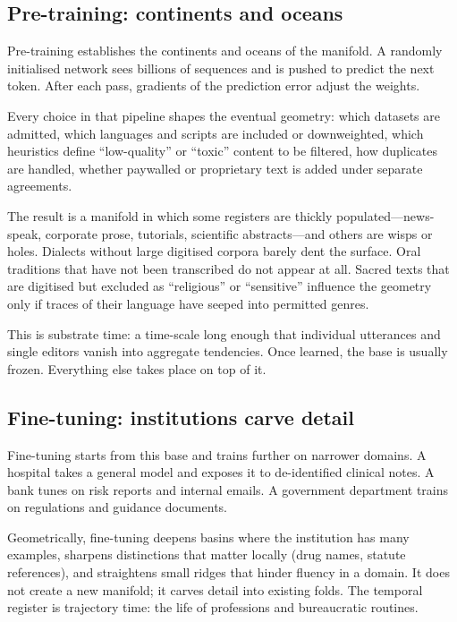 \subsection{Pre-training: continents and oceans}

Pre-training establishes the continents and oceans of the manifold. A randomly initialised network sees billions of sequences and is pushed to predict the next token. After each pass, gradients of the prediction error adjust the weights.

Every choice in that pipeline shapes the eventual geometry: which datasets are admitted, which languages and scripts are included or downweighted, which heuristics define ``low-quality'' or ``toxic'' content to be filtered, how duplicates are handled, whether paywalled or proprietary text is added under separate agreements.

The result is a manifold in which some registers are thickly populated---news-speak, corporate prose, tutorials, scientific abstracts---and others are wisps or holes. Dialects without large digitised corpora barely dent the surface. Oral traditions that have not been transcribed do not appear at all. Sacred texts that are digitised but excluded as ``religious'' or ``sensitive'' influence the geometry only if traces of their language have seeped into permitted genres.

This is substrate time: a time-scale long enough that individual utterances and single editors vanish into aggregate tendencies. Once learned, the base is usually frozen. Everything else takes place on top of it.

\subsection{Fine-tuning: institutions carve detail}

Fine-tuning starts from this base and trains further on narrower domains. A hospital takes a general model and exposes it to de-identified clinical notes. A bank tunes on risk reports and internal emails. A government department trains on regulations and guidance documents.

Geometrically, fine-tuning deepens basins where the institution has many examples, sharpens distinctions that matter locally (drug names, statute references), and straightens small ridges that hinder fluency in a domain. It does not create a new manifold; it carves detail into existing folds. The temporal register is trajectory time: the life of professions and bureaucratic routines.

